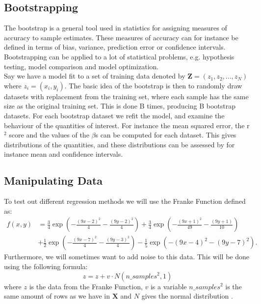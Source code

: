 \documentclass[12pt]{article}
\begin{document}
\subsection{Bootstrapping}
The bootstrap is a general tool used in statistics for assigning measures of accuracy to sample estimates. These measures of accuracy can for instance be defined in terms of bias, variance, prediction error or confidence intervals. Bootstrapping can be applied to a lot of statistical problems, e.g. hypothesis testing, model comparison and model optimization.\\
Say we have a model fit to a set of training data denoted by $\bm{Z}=(z_1,z_2,...,z_N)$ where $z_i = (x_i,y_i)$. The basic idea of the bootstrap is then to randomly draw datasets with replacement from the training set, where each sample has the same size as the original training set. This is done B times, producing B bootstrap datasets. For each bootstrap dataset we refit the model, and examine the behaviour of the quantities of interest. For instance the mean squared error, the r$^2$ score and the values of the $\beta$s can be computed for each dataset. This gives distributions of the quantities, and these distributions can be assessed by for instance mean and confidence intervals.
\subsection{Manipulating Data}
To test out different regression methods we will use the Franke Function defined \cite{Franke} as:
\begin{align*}
f(x,y) &= \frac{3}{4}\exp{\left(-\frac{(9x-2)^2}{4} - \frac{(9y-2)^2}{4}\right)}+\frac{3}{4}\exp{\left(-\frac{(9x+1)^2}{49}- \frac{(9y+1)}{10}\right)} \\
&+\frac{1}{2}\exp{\left(-\frac{(9x-7)^2}{4} - \frac{(9y-3)^2}{4}\right)} -\frac{1}{5}\exp{\left(-(9x-4)^2 - (9y-7)^2\right) }.
\end{align*}
Furthermore, we will sometimes want to add noise to this data. This will be done using the following formula:
\begin{equation*}
z = z + v \cdot N(n\_samples^2, 1)
\end{equation*}
where $z$ is the data from the Franke Function, $v$ is a variable $n\_samples^2$ is the same amount of rows as we have in $\bm{X}$ and $N$ gives the normal distribution \cite{Normal}.
\end{document}

